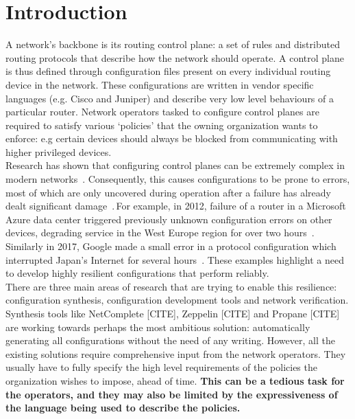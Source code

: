 \section{Introduction}

A network's backbone is its routing control plane: a set of rules and distributed routing protocols that describe how the network should operate. A control plane is thus defined through configuration files present on every individual routing device in the network. These configurations are written in vendor specific languages (e.g. Cisco and Juniper) and describe very low level behaviours of a particular router. Network operators tasked to configure control planes are required to satisfy various `policies' that the owning organization wants to enforce: e.g certain devices should always be blocked from communicating with higher privileged devices.\\

Research has shown that configuring control planes can be extremely complex in modern networks~\cite{complexity}. Consequently, this causes configurations to be prone to errors, most of which are only uncovered during operation after a failure has already dealt significant damage~\cite{errors}. For example, in 2012, failure of a router in a Microsoft Azure data center triggered previously unknown configuration errors on other devices, degrading service in the West Europe region for over two hours~\cite{azure}. Similarly in 2017, Google made a small error in a protocol configuration which interrupted Japan's Internet for several hours~\cite{googlebgp}. These examples highlight a need to develop highly resilient configurations that perform reliably.\\  

There are three main areas of research that are trying to enable this resilience: configuration synthesis, configuration development tools and network verification. Synthesis tools like NetComplete [CITE], Zeppelin [CITE] and Propane [CITE] are working towards perhaps the most ambitious solution: automatically generating all configurations without the need of any writing. However, all the existing solutions require comprehensive input from the network operators. They usually have to fully specify the high level requirements of the policies the organization wishes to impose, ahead of time. \textbf{This can be a tedious task for the operators, and they may also be limited by the expressiveness of the language being used to describe the policies.}\\ 

